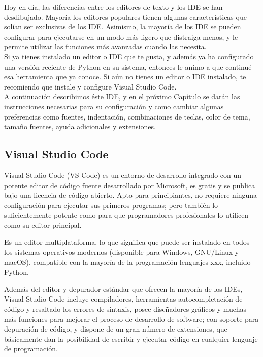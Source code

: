 Hoy en día, las diferencias entre los editores de texto y los IDE se han desdibujado. Mayoría
los editores populares tienen algunas características que solían ser exclusivas de los IDE. Asimismo,
la mayoría de los IDE se pueden configurar para ejecutarse en un modo más ligero que distraiga menos, y le permite utilizar las funciones más avanzadas cuando las necesita.\\


Si ya tienes instalado un editor o IDE que te gusta, y además ya ha configurado una versión reciente de Python en su sistema, entonces le animo a que continué esa herramienta que ya conoce. Si aún no tienes un editor o IDE instalado, te recomiendo que instale y configure Visual Studio Code.\\

 A continuación describimos éste IDE, y en el próximo Capítulo  se darán las instrucciones necesarias para su configuración y  como cambiar algunas preferencias como fuentes, indentación, combinaciones de teclas, color de tema, tamaño fuentes,  ayuda adicionales y extensiones.\\

\subsection*{Visual Studio Code}

Visual Studio Code (VS Code) es un entorno de desarrollo integrado con un potente editor de código fuente desarrollado por  \href{https://visualstudio.microsoft.com/es/}{\color{vino} Microsoft}, es gratis y se publica bajo una licencia de código abierto. 
Apto para principiantes, no requiere ninguna configuración para ejecutar sus primeros programas;  pero también lo suficientemente potente como para que  programadores profesionales lo utilicen como su editor principal.

Es un editor multiplataforma, lo que significa que puede ser instalado en todos los sistemas operativos modernos (disponible para Windows, GNU/Linux y macOS), compatible con la mayoría de la programación lenguajes xxx, incluido Python. 

Además del editor y depurador estándar que ofrecen la mayoría de los IDEs,  Visual Studio Code incluye compiladores, herramientas autocompletación de código y resaltado los errores de sintaxis, posee diseñadores gráficos y muchas más funciones para mejorar el proceso de desarrollo de software; con soporte para depuración de código,  y dispone de un gran número de extensiones, que básicamente dan la posibilidad de escribir y ejecutar código en cualquier lenguaje de programación. 

